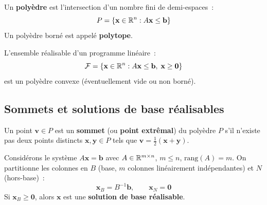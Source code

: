 \begin{definition}
Un \textbf{poly\`edre} est l'intersection d'un nombre fini de demi-espaces~:
\[
  P = \{\mathbf{x} \in \mathbb{R}^n : A\mathbf{x} \le \mathbf{b}\}
\]
Un poly\`edre born\'e est appel\'e \textbf{polytope}.
\end{definition}

\begin{theoreme}
L'ensemble r\'ealisable d'un programme lin\'eaire~:
\[
  \mathcal{F} = \{\mathbf{x} \in \mathbb{R}^n : A\mathbf{x} \le \mathbf{b},\;
  \mathbf{x} \ge \mathbf{0}\}
\]
est un poly\`edre convexe (\'eventuellement vide ou non born\'e).
\end{theoreme}

\begin{center}
\end{center}

\subsection{Sommets et solutions de base r\'ealisables}

\begin{definition}[Sommet]
Un point $\mathbf{v} \in P$ est un \textbf{sommet} (ou \textbf{point
extr\^emal}) du poly\`edre $P$ s'il n'existe pas deux points distincts
$\mathbf{x}, \mathbf{y} \in P$ tels que
$\mathbf{v} = \frac{1}{2}(\mathbf{x} + \mathbf{y})$.
\end{definition}

\begin{definition}
Consid\'erons le syst\`eme $A\mathbf{x} = \mathbf{b}$ avec
$A \in \mathbb{R}^{m \times n}$, $m \le n$, $\text{rang}(A) = m$.  On partitionne
les colonnes en $B$ (base, $m$ colonnes lin\'eairement ind\'ependantes) et
$N$ (hors-base)~:
\[
  \mathbf{x}_B = B^{-1}\mathbf{b}, \qquad \mathbf{x}_N = \mathbf{0}
\]
Si $\mathbf{x}_B \ge \mathbf{0}$, alors $\mathbf{x}$ est une
\textbf{solution de base r\'ealisable}.
\end{definition}

